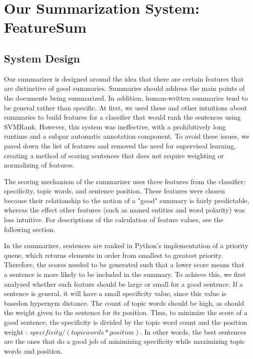 \documentclass[11pt,letterpaper]{article}
\begin{document}
\section{Our Summarization System: FeatureSum}

\subsection{System Design}
Our summarizer is designed around the idea that there are certain features that are distinctive of good summaries. Summaries should address the main points of the documents being summarized. In addition, human-written summaries tend to be general rather than specific. At first, we used these and other intuitions about summaries to build features for a classifier that would rank the sentences using SVMRank. However, this system was ineffective, with a prohibitively long runtime and a subpar automatic annotation component. To avoid these issues, we pared down the list of features and removed the need for supervised learning, creating a method of scoring sentences that does not require weighting or normalizing of features. 

The scoring mechanism of the summarizer uses three features from the classifier: specificity, topic words, and sentence position. These features were chosen because their relationship to the notion of a "good" summary is fairly predictable, whereas the effect other features (such as named entities and word polarity) was less intuitive. For descriptions of the calculation of feature values, see the following section.

In the summarizer, sentences are ranked in Python's implementation of a priority queue, which returns elements in order from smallest to greatest priority. Therefore, the scores needed to be generated such that a lower score means that a sentence is more likely to be included in the summary.
To achieve this, we first analyzed whether each feature should be large or small for a good sentence. If a sentence is general, it will have a small specificity value, since this value is basedon hypernym distance. The count of topic words should be high, as should the weight given to the sentence for its position. Thus, to minimize the score of a good sentence, the specificity is divided by the topic word count and the position weight : $specificity / (topic words * position) $. In other words, the best sentences are the ones that do a good job of minimizing specificity while maximizing topic words and position.
\end{document}
